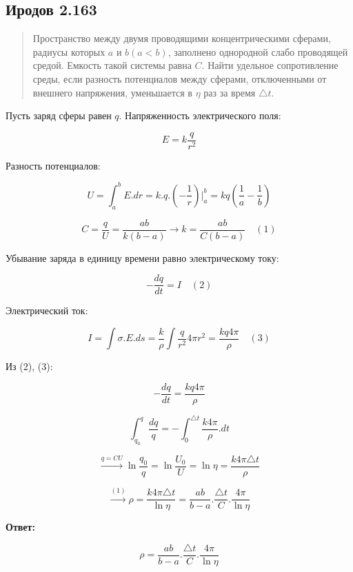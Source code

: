 \subsection*{Иродов 2.163}

\setcounter{equation}{0}

\begin{abstract}
Пространство между двумя проводящими концентрическими сферами, радиусы которых $a$ и $b (a < b)$, заполнено однородной слабо проводящей средой. Емкость такой системы равна $C$. Найти удельное сопротивление среды, если разность потенциалов между сферами, отключенными от внешнего напряжения, уменьшается в $\eta$ раз за время $\triangle t$.
\end{abstract}

\noindent \hrulefill

Пусть заряд сферы равен $q$. Напряженность электрического поля:

$$E = k  \frac{q}{r^2}$$

Разность потенциалов:

$$U = \displaystyle \int_{a}^{b} E.dr = k.q.(-\frac{1}{r}) |_{a}^{b} = kq(\frac{1}{a} - \frac{1}{b})$$

$$C = \frac{q}{U} = \frac{ab}{k(b-a)} \xrightarrow{} k = \frac{ab}{C(b-a)}  \quad (1)$$

Убывание заряда в единицу времени равно электрическому току:

$$- \frac{dq}{dt} = I \quad (2)$$

Электрический ток:

$$I = \displaystyle \int \sigma .E .ds = \frac{k}{\rho} \displaystyle \int \frac{q}{r^2} 4 \pi r^2 = \frac{kq4 \pi}{\rho}  \quad (3)$$

Из (2), (3):

$$-\frac{dq}{dt} = \frac{kq4 \pi}{\rho}$$

$$\displaystyle \int_{q_0}^{q} \frac{dq}{q} = - \displaystyle \int_{0}^{\triangle t} \frac{k 4 \pi }{\rho} . dt$$

$$\xrightarrow{q = CU} \ln{\frac{q_0}{q}= \ln{\frac{U_0}{U}}} = \ln{\eta} = \frac{k4 \pi \triangle t}{\rho}$$

$$\xrightarrow{(1)} \rho = \frac{k 4 \pi \triangle t}{\ln{\eta}} = \frac{ab}{b-a} . \frac{\triangle t}{C} . \frac{4 \pi}{\ln{\eta}}$$

\textbf{Ответ:}


$$\rho = \frac{ab}{b-a} . \frac{\triangle t}{C} . \frac{4 \pi}{\ln{\eta}}$$












